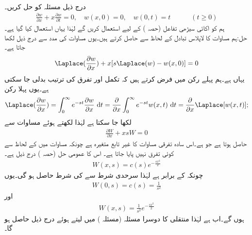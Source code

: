 \quad {}\\
درج ذیل مسئلہ کو حل کریں۔
\begin{align}\label{مساوات_جزوی_لاپلاس_پہلی_مثال_الف}
\frac{\partial w}{\partial x}+x\frac{\partial w}{\partial t}=0,\quad w(x,0)=0,\quad w(0,t)=t\quad \quad \quad (t\ge 0)
\end{align}
 ہم  کو اکائی سیڑھی تفاعل (حصہ ) کے لیے استعمال کریں گے لہٰذا یہاں  استعمال کیا گیا ہے۔ \\
حل:\quad ہم مساوات  کا لاپلاس تبادل  کے لحاظ سے حاصل کرتے ہیں۔یوں مساوات  کی مدد سے درج ذیل لکھا جاتا ہے۔
\begin{align}\label{مساوات_جزوی_لاپلاس_پہلی_مثال_ب}
\Laplace(\frac{\partial w}{\partial x})+x[s\Laplace(w)-w(x,0)]=0
\end{align}
یہاں  ہے۔ہم پہلے رکن میں فرض کرتے ہیں کہ تکمل اور تفرق کی ترتیب بدلی جا سکتی ہے۔یوں پہلا رکن 
\begin{align}\label{مساوات_جزوی_لاپلاس_پہلی_مثال_پ}
\Laplace(\frac{\partial w}{\partial x})=\int_0^{\infty} e^{-st}\frac{\partial w}{\partial x}\,\dif t=\frac{\partial}{\partial x}\int_0^{\infty} e^{-st} w(x,t)\,\dif t=\frac{\partial}{\partial x}\Laplace[w(x,t)];
\end{align} 
لکھا جا سکتا ہے لہٰذا  لکھتے ہوئے  مساوات  سے
\begin{align*}
\frac{\partial W}{\partial x}+xsW=0
\end{align*}
حاصل ہوتا ہے  جو  ہے۔اس سادہ تفرقی مساوات کا غیر تابع متغیرہ  ہے چونکہ مساوات میں  کے لحاظ سے کوئی تفرق نہیں پایا جاتا ہے۔ اس کا عمومی حل (حصہ ) درج ذیل ہے۔
\begin{align*}
W(x,s)=c(s)e^{-\frac{sx^2}{2}}
\end{align*}
چونکہ  کے برابر ہے لہٰذا سرحدی شرط  سے  کی شرط حاصل ہو گی۔یوں
\begin{align*}
W(0,s)=c(s)=\frac{1}{s^2}
\end{align*}
اور
\begin{align*}
W(x,s)=\frac{1}{s^2}e^{-\frac{sx^2}{2}}
\end{align*}
ہوں گے۔اب  ہے لہٰذا  منتقلی کا دوسرا مسئلہ (مسئلہ ) میں  لیتے ہوئے درج ذیل حاصل ہو گا۔
